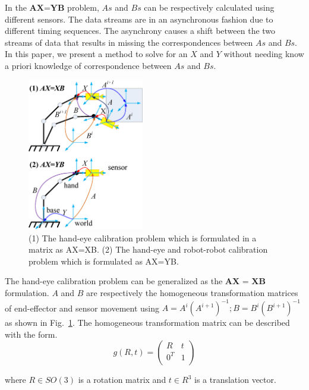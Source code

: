 \documentclass[conference,letterpaper]{IEEEtran}
\begin{document}
In the $\textbf{AX=YB}$ problem, $As$ and $Bs$ can be respectively calculated using different sensors. The data streams are in an asynchronous fashion due to different timing sequences. The asynchrony causes a shift between the two streams of data that results in missing the correspondences between $As$ and $Bs$. In this paper, we present a method to solve for an $X$ and $Y$ without needing know a priori knowledge of correspondence between $As$ and $Bs$.

\begin{center}
\begin{figure}[htbp]
\centering
\includegraphics[width=2in]{fig1.eps}
\caption{
(1) The hand-eye calibration problem which is formulated in a matrix as AX=XB. (2) The hand-eye and robot-robot calibration problem which is formulated as AX=YB.
}
\label{fig1}
\end{figure}
\end{center}

The hand-eye calibration problem can be generalized as the $\textbf{AX = XB}$ formulation. $A$ and $B$ are respectively the homogeneous transformation matrices of end-effector and sensor movement using $A = A^{i}(A^{i+1})^{-1}; B = B^{i}(B^{i+1})^{-1}$ as shown in Fig.~\ref{fig1}. The homogeneous transformation matrix can be described with the form.
\begin{equation}\label{equ0}
    g(R,t)=\left(
             \begin{array}{cc}
               R & t \\
               0^{T} & 1 \\
             \end{array}
           \right)
\end{equation}

where $R \in SO(3)$ is a rotation matrix and $t \in R^{3}$ is a translation vector.
\end{document}
